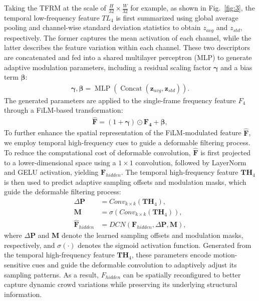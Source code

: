 \documentclass[lettersize,journal]{IEEEtran}
\begin{document}
Taking the TFRM at the scale of $\frac{H}{32} \times \frac{W}{32}$ for example, as shown in Fig.~\ref{fig:3}, the temporal low-frequency feature \(TL_4\) is first summarized using global average pooling and channel-wise standard deviation statistics to obtain \(z_{avg}\) and \(z_{std}\), respectively. The former captures the mean activation of each channel, while the latter describes the feature variation within each channel. These two descriptors are concatenated and fed into a shared multilayer perceptron (MLP) to generate adaptive modulation parameters, including a residual scaling factor $\boldsymbol{\gamma}$ and a bias term $\boldsymbol{\beta}$:
\begin{equation}
\begin{aligned}
\boldsymbol{\gamma}, \boldsymbol{\beta}
=
\operatorname{MLP}
\left(
\operatorname{Concat}
\left(
\mathbf{z}_{avg},
\mathbf{z}_{std}
\right)
\right).
\end{aligned}
\end{equation}
The generated parameters are applied to the single-frame frequency feature $F_4$ through a FiLM-based transformation:
\begin{equation}
\begin{aligned}
\hat{\mathbf{F}}
=
\left(1+\boldsymbol{\gamma}\right)
\odot
\mathbf{F_4}
+
\boldsymbol{\beta},
\end{aligned}
\end{equation}
To further enhance the spatial representation of the FiLM-modulated feature $\hat{\mathbf{F}}$, we employ temporal high-frequency cues to guide a deformable filtering process. To reduce the computational cost of deformable convolution, \(\hat{\mathbf{F}}\) is first projected to a lower-dimensional space using a \(1\times1\) convolution, followed by LayerNorm and GELU activation, yielding \(\mathbf{F}_{hidden}\). The temporal high-frequency feature $\mathbf{TH}_4$ is then used to predict adaptive sampling offsets and modulation masks, which guide the deformable filtering process:
\begin{equation}
\begin{aligned}
\Delta \mathbf{P}
&=
Conv_{k\times k}(\mathbf{TH}_4),
\\
\mathbf{M}
&=
\sigma(Conv_{k\times k}(\mathbf{TH}_4)),
\\
\hat{\mathbf{F}}_{hidden}
&=
DCN(\mathbf{F}_{hidden},\Delta \mathbf{P},\mathbf{M}),
\end{aligned}
\end{equation}
where $\Delta \mathbf{P}$ and $\mathbf{M}$ denote the learned sampling offsets and modulation masks, respectively, and $\sigma(\cdot)$ denotes the sigmoid activation function. Generated from the temporal high-frequency feature $\mathbf{TH}_4$, these parameters encode motion-sensitive cues and guide the deformable convolution to adaptively adjust its sampling patterns. As a result, $F_{hidden}$ can be spatially reconfigured to better capture dynamic crowd variations while preserving its underlying structural information.
\end{document}

